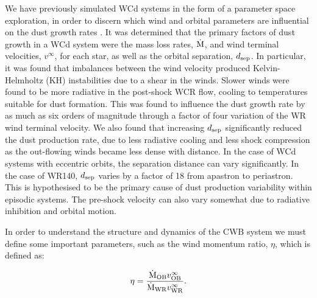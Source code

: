We have previously simulated WCd systems in the form of a parameter space exploration, in order to discern which wind and orbital parameters are influential on the dust growth rates \parencite{eatsonExplorationDustGrain2022}.
It was determined that the primary factors of dust growth in a WCd system were the mass loss rates, $\dot{\text{M}}$, and wind terminal velocities, $v^\infty$, for each star, as well as the orbital separation, $d_\text{sep}$.
In particular, it was found that imbalances between the wind velocity produced Kelvin-Helmholtz (KH) instabilities due to a shear in the winds.
Slower winds were found to be more radiative in the post-shock WCR flow, cooling to temperatures suitable for dust formation.
This was found to influence the dust growth rate by as much as six orders of magnitude through a factor of four variation of the WR wind terminal velocity.
We also found that increasing $d_\text{sep}$ significantly reduced the dust production rate, due to less radiative cooling and less shock compression as the out-flowing winds became less dense with distance.
In the case of WCd systems with eccentric orbits, the separation distance can vary significantly.
In the case of WR140, $d_\text{sep}$ varies by a factor of 18 from apastron to periastron.
This is hypothesised to be the primary cause of dust production variability within episodic systems.
The pre-shock velocity can also vary somewhat due to radiative inhibition and orbital motion.

In order to understand the structure and dynamics of the CWB system we must define some important parameters, such as the wind momentum ratio, $\eta$, which is defined as:

\begin{equation}
  \eta = \frac{\dot{\text{M}}_{\text{OB}} v^\infty_{\text{OB}}}{\dot{\text{M}}_{\text{WR}} v^\infty_{\text{WR}}} .
\end{equation}

